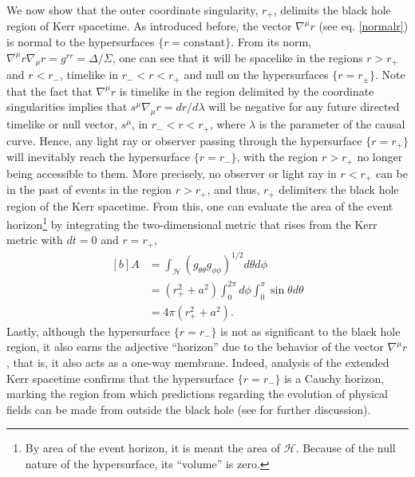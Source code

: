\documentclass[
12pt,		%
openright,	%
twoside,  %
a4paper,			%
chapter=TITLE,		%
english,			%
french,				%
spanish,			%
brazil				%
]{USPSC-classe/USPSC}
\begin{document}
We now show that the outer coordinate singularity, $r_+$, delimits the black hole region of Kerr spacetime. As introduced before, the vector $\nabla^{\mu}r$ (see eq. \ref{normalr}) is normal to the hypersurfaces $\{r=\text{constant}\}$. From its norm, $\nabla^{\mu}r\nabla_{\mu}r=g^{rr}=\Delta/\Sigma$, one can see that it will be spacelike in the regions $r>r_+$ and $r<r_-$, timelike in $r_-<r<r_+$ and null on the hypersurfaces $\{r=r_{\pm}\}$. Note that the fact that $\nabla^{\mu}r$ is timelike in the region delimited by the coordinate singularities implies that $s^{\mu}\nabla_{\mu}r=dr/d\lambda$ will be negative for any future directed timelike or null vector, $s^{\mu}$, in $r_-<r<r_+$, where $\lambda$ is the parameter of the causal curve. Hence, any light ray or observer passing through the hypersurface $\{r=r_+\}$ will inevitably reach the hypersurface $\{r=r_-\}$, with the region $r>r_+$ no longer being accessible to them. More precisely, no observer or light ray in $r<r_+$ can be in the past of events in the region $r>r_+$, and thus, $r_+$ delimiters the black hole region of the Kerr spacetime. From this, one can evaluate the area of the event horizon\footnote{By area of the event horizon, it is meant the area of $\mathscr{H}$. Because of the null nature of the hypersurface, its ``volume'' is zero.} by integrating the two-dimensional metric that rises from the Kerr metric with $dt=0$ and $r=r_+$, 
\begin{equation}\label{areakerr}
    \begin{aligned}[b]
    A &=\int_{\mathscr{H}}(g_{\theta\theta}g_{\phi\phi})^{1/2}d\theta d\phi\\
         &=(r_+^2+a^2)\int_0^{2\pi}d\phi\int_0^{\pi}\sin{\theta}d\theta\\
         &=4\pi(r_+^2+a^2).   
    \end{aligned}
\end{equation}
Lastly, although the hypersurface $\{r=r_-\}$ is not as significant to the black hole region, it also earns the adjective ``horizon'' due to the behavior of the vector $\nabla^{\mu}r$, that is, it also acts as a one-way membrane. Indeed, analysis of the extended Kerr spacetime confirms that the hypersurface $\{r=r_-\}$ is a Cauchy horizon, marking the region from which predictions regarding the evolution of physical fields can be made from outside the black hole (see \cite{Hawking1973,Wald1984} for further discussion). 
\end{document}
